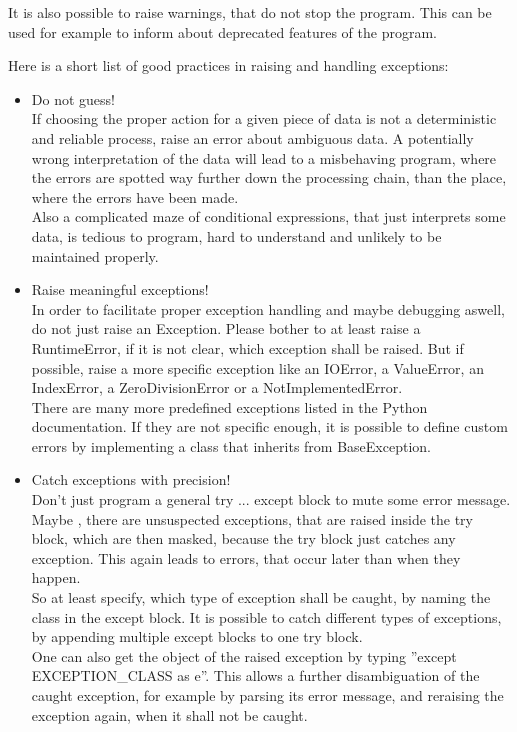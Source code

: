 		It is also possible to raise warnings, that do not stop the program.
		This can be used for example to inform about deprecated features of the program.

		Here is a short list of good practices in raising and handling exceptions:
		\begin{itemize}
			\item Do not guess!\\
			      If choosing the proper action for a given piece of data is not a deterministic and reliable process, raise an error about ambiguous data.
			      A potentially wrong interpretation of the data will lead to a misbehaving program, where the errors are spotted way further down the processing chain, than the place, where the errors have been made.\\
			      Also a complicated maze of conditional expressions, that just interprets some data, is tedious to program, hard to understand and unlikely to be maintained properly.
			\item Raise meaningful exceptions!\\
			      In order to facilitate proper exception handling and maybe debugging aswell, do not just raise an {\normalfont \ttfamily Exception}.
			      Please bother to at least raise a {\normalfont \ttfamily RuntimeError}, if it is not clear, which exception shall be raised.
			      But if possible, raise a more specific exception like an {\normalfont \ttfamily IOError}, a {\normalfont \ttfamily ValueError}, an {\normalfont \ttfamily IndexError}, a {\normalfont \ttfamily ZeroDivisionError} or a {\normalfont \ttfamily NotImplementedError}.\\
			      There are many more predefined exceptions listed in the Python documentation.
			      If they are not specific enough, it is possible to define custom errors by implementing a class that inherits from {\normalfont \ttfamily BaseException}.
			\item Catch exceptions with precision!\\
			      Don't just program a general {\normalfont \ttfamily try ... except} block to mute some error message.
			      Maybe , there are unsuspected exceptions, that are raised inside the {\normalfont \ttfamily try} block, which are then masked, because the {\normalfont \ttfamily try} block just catches any exception.
			      This again leads to errors, that occur later than when they happen.\\
			      So at least specify, which type of exception shall be caught, by naming the class in the {\normalfont \ttfamily except} block.
			      It is possible to catch different types of exceptions, by appending multiple {\normalfont \ttfamily except} blocks to one {\normalfont \ttfamily try} block.\\
			      One can also get the object of the raised exception by typing ''{\normalfont \ttfamily except EXCEPTION\_CLASS as e}''.
			      This allows a further disambiguation of the caught exception, for example by parsing its error message, and reraising the exception again, when it shall not be caught.
		\end{itemize}


